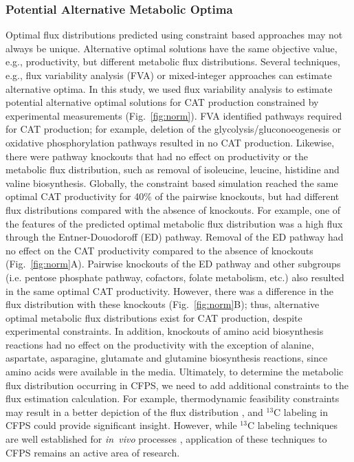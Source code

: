 \documentclass[journal=asbcd6,manuscript=article]{achemso}
\begin{document}
\subsubsection{Potential Alternative Metabolic Optima}
Optimal flux distributions predicted using constraint based approaches may not always be unique.
Alternative optimal solutions have the same objective value, e.g., productivity, but different metabolic flux distributions.
Several techniques, e.g., flux variability analysis (FVA) \cite{Mahadevan2003264,Schuetz119} or mixed-integer approaches \cite{LEE2000711} can estimate alternative optima.
In this study, we used flux variability analysis to estimate potential alternative optimal solutions for CAT production constrained by experimental measurements (Fig.~\ref{fig:norm}).
FVA identified pathways required for CAT production; for example, deletion of the glycolysis/gluconoeogenesis or oxidative phosphorylation pathways resulted in no CAT production.
Likewise, there were pathway knockouts that had no effect on productivity or the metabolic flux distribution, such as removal of isoleucine, leucine, histidine and valine biosynthesis.
Globally, the constraint based simulation reached the same optimal CAT productivity for 40\% of the pairwise knockouts, but had different flux distributions compared with the absence of knockouts.
For example, one of the features of the predicted optimal metabolic flux distribution was a high flux through the Entner-Douodoroff (ED) pathway.
Removal of the ED pathway had no effect on the CAT productivity compared to the absence of knockouts (Fig.~\ref{fig:norm}A).
Pairwise knockouts of the ED pathway and other subgroups (i.e. pentose phosphate pathway, cofactors, folate metabolism, etc.) also resulted in the same optimal CAT productivity.
However, there was a difference in the flux distribution with these knockouts (Fig.~\ref{fig:norm}B); thus, alternative optimal metabolic flux distributions exist for CAT production, despite experimental constraints.
In addition, knockouts of amino acid biosynthesis reactions had no effect on the productivity with the exception of alanine, aspartate, asparagine, glutamate and glutamine biosynthesis reactions, since amino acids were available in the media.
Ultimately, to determine the metabolic flux distribution occurring in CFPS, we need to add additional constraints to the flux estimation calculation.
For example, thermodynamic feasibility constraints may result in a better depiction of the flux distribution \cite{Henry:2007,Hamilton:2013},
and $^{13}$C labeling in CFPS could provide significant insight.
However, while $^{13}$C labeling techniques are well established for \emph{in~vivo} processes \cite{Zamboni:2009},
application of these techniques to CFPS remains an active area of research.
\end{document}
